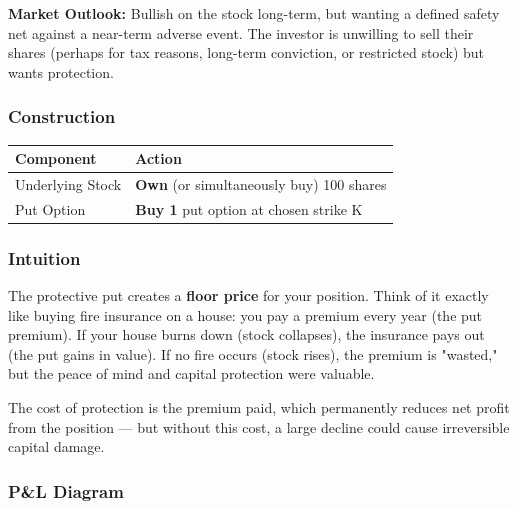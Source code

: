 \documentclass[12pt,openany]{book}
\begin{document}
\textbf{Market Outlook:} Bullish on the stock long-term, but wanting a defined safety net against a near-term adverse event. The investor is unwilling to sell their shares (perhaps for tax reasons, long-term conviction, or restricted stock) but wants protection.



\subsubsection{Construction}

\begin{center}
\scriptsize
\setlength{\tabcolsep}{3pt}
\begin{tabular}{|L{6.00cm}|L{6.00cm}|}
\hline
Component & Action \\
\hline
Underlying Stock & \textbf{Own} (or simultaneously buy) 100 shares \\
\hline
Put Option & \textbf{Buy 1} put option at chosen strike K \\
\hline
\end{tabular}
\end{center}



\subsubsection{Intuition}

The protective put creates a \textbf{floor price} for your position. Think of it exactly like buying fire insurance on a house: you pay a premium every year (the put premium). If your house burns down (stock collapses), the insurance pays out (the put gains in value). If no fire occurs (stock rises), the premium is "wasted," but the peace of mind and capital protection were valuable.

The cost of protection is the premium paid, which permanently reduces net profit from the position — but without this cost, a large decline could cause irreversible capital damage.



\subsubsection{P\&L Diagram}
\end{document}
